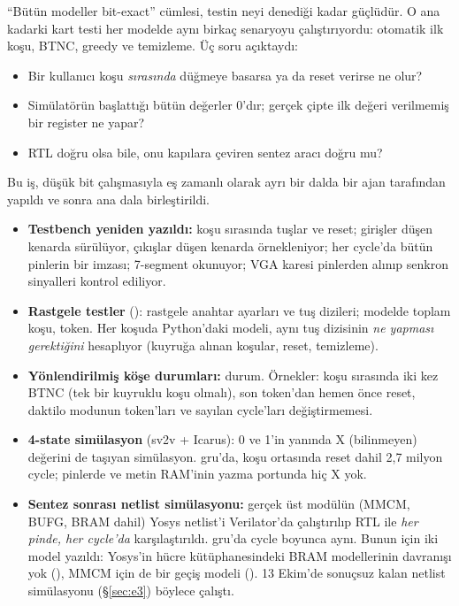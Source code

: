 
\neden
“Bütün modeller bit-exact” cümlesi, testin neyi denediği kadar güçlüdür. O ana kadarki kart testi her modelde aynı birkaç senaryoyu çalıştırıyordu: otomatik ilk koşu, BTNC, greedy ve temizleme. Üç soru açıktaydı:
\begin{itemize}
  \item Bir kullanıcı koşu \emph{sırasında} düğmeye basarsa ya da reset verirse ne olur?
  \item Simülatörün başlattığı bütün değerler 0'dır; gerçek çipte ilk değeri verilmemiş bir register ne yapar?
  \item RTL doğru olsa bile, onu kapılara çeviren sentez aracı doğru mu?
\end{itemize}
Bu iş, düşük bit çalışmasıyla eş zamanlı olarak ayrı bir dalda bir ajan tarafından yapıldı ve sonra ana dala birleştirildi.

\neyapildi
\begin{itemize}
  \item \textbf{Testbench yeniden yazıldı:} koşu sırasında tuşlar ve reset; girişler düşen kenarda sürülüyor, çıkışlar düşen kenarda örnekleniyor; her cycle'da bütün pinlerin bir imzası; 7-segment okunuyor; VGA karesi pinlerden alınıp senkron sinyalleri kontrol ediliyor.
  \item \textbf{Rastgele testler} (): rastgele anahtar ayarları ve tuş dizileri; \gFuzzModels{} modelde toplam \gFuzzRuns{} koşu, \gFuzzTokens{} token. Her koşuda Python'daki  modeli, aynı tuş dizisinin \emph{ne yapması gerektiğini} hesaplıyor (kuyruğa alınan koşular, reset, temizleme).
  \item \textbf{Yönlendirilmiş köşe durumları:} \gDirectedCases{} durum. Örnekler: koşu sırasında iki kez BTNC (tek bir kuyruklu koşu olmalı), son token'dan hemen önce reset, daktilo modunun token'ları ve sayılan cycle'ları değiştirmemesi.
  \item \textbf{4-state simülasyon} (sv2v + Icarus): 0 ve 1'in yanında X (bilinmeyen) değerini de taşıyan simülasyon. gru'da, koşu ortasında reset dahil 2,7 milyon cycle; pinlerde ve metin RAM'inin yazma portunda hiç X yok.
  \item \textbf{Sentez sonrası netlist simülasyonu:} gerçek üst modülün (MMCM, BUFG, BRAM dahil) Yosys netlist'i Verilator'da çalıştırılıp RTL ile \emph{her pinde, her cycle'da} karşılaştırıldı. gru'da \gNetlistGruCycles{} cycle boyunca aynı. Bunun için iki model yazıldı: Yosys'in hücre kütüphanesindeki BRAM modellerinin davranışı yok (), MMCM için de bir geçiş modeli (). 13 Ekim'de sonuçsuz kalan netlist simülasyonu (§\ref{sec:e3}) böylece çalıştı.
\end{itemize}

